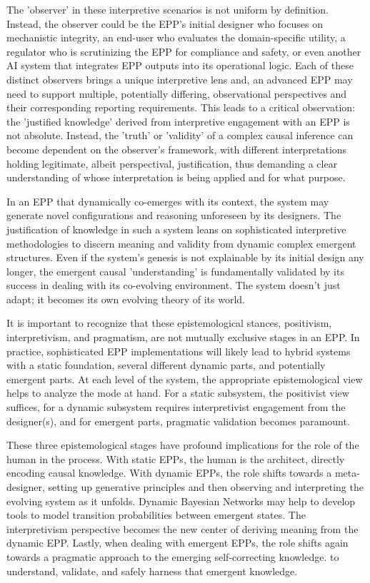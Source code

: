 \documentclass{article}
\begin{document}
The 'observer' in these interpretive scenarios is not uniform by definition. Instead, the observer could be the EPP's initial designer who focuses on mechanistic integrity, an end-user who evaluates the domain-specific utility, a regulator who is scrutinizing the EPP for compliance and safety, or even another AI system that integrates EPP outputs into its operational logic. Each of these distinct observers brings a unique interpretive lens and, an advanced EPP may need to support multiple, potentially differing, observational perspectives and their corresponding reporting requirements. This leads to a critical observation: the 'justified knowledge' derived from interpretive engagement with an EPP is not absolute. Instead, the 'truth' or 'validity' of a complex causal inference can become dependent on the observer's framework, with different interpretations holding legitimate, albeit perspectival, justification, thus demanding a clear understanding of whose interpretation is being applied and for what purpose.

In an EPP that dynamically co-emerges with its context, the system may generate novel configurations and reasoning unforeseen by its designers. The justification of knowledge in such a system leans on sophisticated interpretive methodologies to discern meaning and validity from dynamic complex emergent structures. Even if the system’s genesis is not explainable by its initial design any longer, the emergent causal 'understanding' is fundamentally validated by its success in dealing with its co-evolving environment. The system doesn't just adapt; it becomes its own evolving theory of its world.

It is important to recognize that these epistemological stances, positivism, interpretivism, and pragmatism, are not mutually exclusive stages in an EPP. In practice, sophisticated EPP implementations will likely lead to hybrid systems with a static foundation, several different dynamic parts, and potentially emergent parts. At each level of the system, the appropriate epistemological view helps to analyze the mode at hand. For a static subsystem, the positivist view suffices, for a dynamic subsystem requires interpretivist engagement from the designer(s), and for emergent parts, pragmatic validation becomes paramount.

These three epistemological stages have profound implications for the role of the human in the process. With static EPPs, the human is the architect, directly encoding causal knowledge. With dynamic EPPs, the role shifts towards a meta-designer, setting up generative principles and then observing and interpreting the evolving system as it unfolds. Dynamic Bayesian Networks\cite{dagum1992dynamic} may help to develop tools to model transition probabilities between emergent states. The interpretivism perspective becomes the new center of deriving meaning from the dynamic EPP. Lastly, when dealing with emergent EPPs, the role shifts again towards a pragmatic approach to the emerging self-correcting knowledge. to understand, validate, and safely harness that emergent knowledge.
\end{document}
